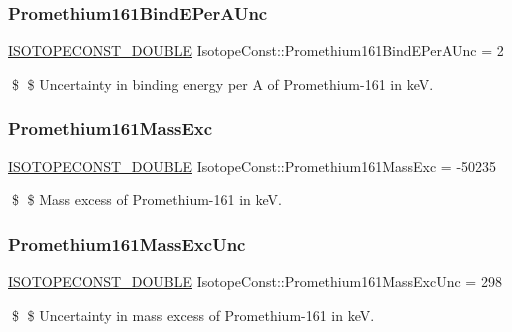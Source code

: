 \subsubsection{\texorpdfstring{Promethium161\+Bind\+E\+Per\+A\+Unc}{Promethium161BindEPerAUnc}}
{\footnotesize\ttfamily \mbox{\hyperlink{group___isotope_const-_macros_ga8f45a7272ce02c0b4c65c44636ed719a}{I\+S\+O\+T\+O\+P\+E\+C\+O\+N\+S\+T\+\_\+\+D\+O\+U\+B\+LE}} Isotope\+Const\+::\+Promethium161\+Bind\+E\+Per\+A\+Unc = 2}

\$ \$ Uncertainty in binding energy per A of Promethium-\/161 in keV. \mbox{\label{group___isotope_const-_promethium-_pm161_gab543a23108609935e5bdec3692fc1572}} 
\subsubsection{\texorpdfstring{Promethium161\+Mass\+Exc}{Promethium161MassExc}}
{\footnotesize\ttfamily \mbox{\hyperlink{group___isotope_const-_macros_ga8f45a7272ce02c0b4c65c44636ed719a}{I\+S\+O\+T\+O\+P\+E\+C\+O\+N\+S\+T\+\_\+\+D\+O\+U\+B\+LE}} Isotope\+Const\+::\+Promethium161\+Mass\+Exc = -\/50235}

\$ \$ Mass excess of Promethium-\/161 in keV. \mbox{\label{group___isotope_const-_promethium-_pm161_ga5239e6b794f0cf1adf445d39b508fc70}} 
\subsubsection{\texorpdfstring{Promethium161\+Mass\+Exc\+Unc}{Promethium161MassExcUnc}}
{\footnotesize\ttfamily \mbox{\hyperlink{group___isotope_const-_macros_ga8f45a7272ce02c0b4c65c44636ed719a}{I\+S\+O\+T\+O\+P\+E\+C\+O\+N\+S\+T\+\_\+\+D\+O\+U\+B\+LE}} Isotope\+Const\+::\+Promethium161\+Mass\+Exc\+Unc = 298}

\$ \$ Uncertainty in mass excess of Promethium-\/161 in keV. \mbox{\label{group___isotope_const-_promethium-_pm161_ga2777beb0d7f6b68dbcacc21d58207e24}} 
